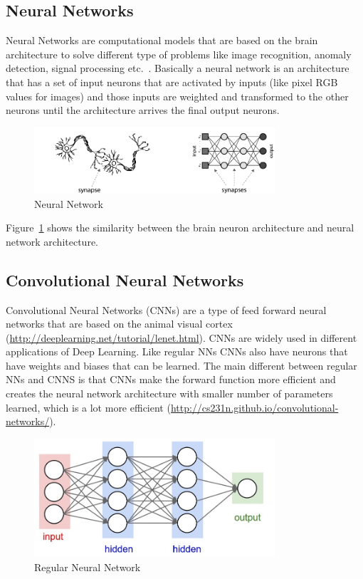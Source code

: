 \subsection{Neural Networks}
Neural Networks are computational models that are based on the brain architecture to solve different type of problems like image recognition, anomaly detection, signal processing etc.\ \citep{shiffman2012nature}. Basically a neural network is an architecture that has a set of input neurons that are activated by inputs (like pixel RGB values for images) and those inputs are weighted and transformed to the other neurons until the architecture arrives the final output neurons. 

\begin{figure}[t]
\centering
\includegraphics[width=0.8\textwidth]{Figures/nn}
\caption{Neural Network}
\label{fignn}
\end{figure}

Figure~\ref{fignn} shows the similarity between the brain neuron architecture and neural network architecture. 

\subsection{Convolutional Neural Networks}
Convolutional Neural Networks (CNNs) are a type of feed forward neural networks that are based on the animal visual cortex (\url{http://deeplearning.net/tutorial/lenet.html}). CNNs are widely used in different applications of Deep Learning. 
Like regular NNs CNNs also have neurons that have weights and biases that can be learned. The main different between regular NNs and CNNS is that CNNs make the forward function more efficient and creates the neural network architecture with smaller number of parameters learned, which is a lot more efficient (\url{http://cs231n.github.io/convolutional-networks/}).

\begin{figure}[t]
\centering
\includegraphics[width=0.8\textwidth]{Figures/regnn}
\caption{Regular Neural Network}
\label{figregnn}
\end{figure}

